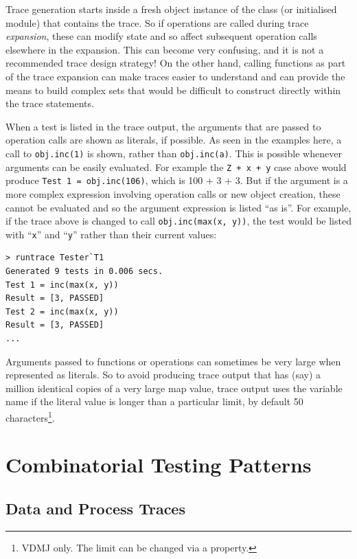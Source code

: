 \documentclass{overturerepchap}
\begin{document}
Trace generation starts inside a fresh object instance of the class (or
initialised module) that contains the trace. So if operations are called during
trace \emph{expansion}, these can modify state and so affect subsequent
operation calls elsewhere in the expansion. This can become very confusing, and
it is not a recommended trace design strategy! On the other hand, calling
functions as part of the trace expansion can make traces easier to understand
and can provide the means to build complex sets that would be difficult to
construct directly within the trace statements.

When a test is listed in the trace output, the arguments that are passed to
operation calls are shown as literals, if possible. As seen in the examples
here, a call to \texttt{obj.inc(1)} is shown, rather than \texttt{obj.inc(a)}. This is
possible whenever arguments can be easily evaluated. For example the \texttt{Z
+ x + y} case above would produce \texttt{Test 1 = obj.inc(106)}, which is 100 +
3 + 3. But if the argument is a more complex expression involving operation
calls or new object creation, these cannot be evaluated and so the argument
expression is listed ``as is''. For example, if the trace above is changed to
call \texttt{obj.inc(max(x, y))}, the test would be listed with ``\texttt{x}''
and ``\texttt{y}'' rather than their current values:

\small
\lstset{style=tool,language=}
\begin{lstlisting}[escapechar=@]
> runtrace Tester`T1
Generated 9 tests in 0.006 secs. 
Test 1 = inc(max(x, y))
Result = [3, PASSED]
Test 2 = inc(max(x, y))
Result = [3, PASSED]
...
\end{lstlisting}
\lstset{style=mystyle}
\lstset{language=VDM++}
\normalsize

\noindent Arguments passed to functions or operations can sometimes be very
large when represented as literals. So to avoid producing trace output that has (say)
a million identical copies of a very large map value, trace output uses the
variable name if the literal value is longer than a particular limit, by default
50 characters\footnote{VDMJ only. The limit can be changed via a property.}.

\chapter{Combinatorial Testing Patterns}
\label{chap:patterns}

\section{Data and Process Traces}
\label{chap:dataprocess}
\end{document}
